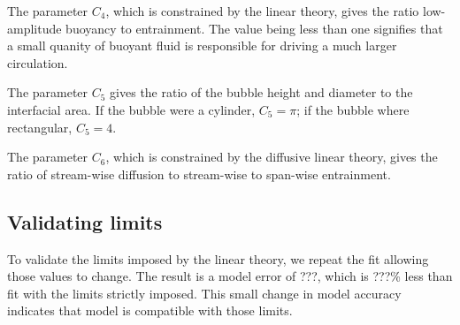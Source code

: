 The parameter $C_4$, which is constrained by the linear theory, gives the ratio low-amplitude buoyancy to entrainment.
The value being less than one signifies that a small quanity of buoyant fluid is responsible for driving a much larger circulation.

The parameter $C_5$ gives the ratio of the bubble height and diameter to the interfacial area.
If the bubble were a cylinder, $C_5 = \pi$; if the bubble where rectangular, $C_5 = 4$.

The parameter $C_6$, which is constrained by the diffusive linear theory, gives the ratio of stream-wise diffusion to stream-wise to span-wise entrainment.

\subsection{Validating limits}
To validate the limits imposed by the linear theory, we repeat the fit allowing those values to change.
The result is a model error of ???, which is ???\% less than fit with the limits strictly imposed.
This small change in model accuracy indicates that model is compatible with those limits.


